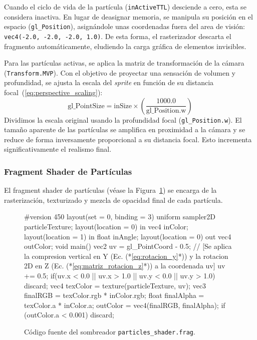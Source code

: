 Cuando el ciclo de vida de la partícula (\texttt{inActiveTTL}) desciende a cero, esta se considera inactiva. En lugar de deasignar memoria, se manipula su posición en el espacio (\texttt{gl\_Position}), asignándole unas coordenadas fuera del area de visión: \texttt{vec4(-2.0, -2.0, -2.0, 1.0)}. De esta forma, el rasterizador descarta el fragmento automáticamente, eludiendo la carga gráfica de elementos invisibles.

Para las partículas activas, se aplica la matriz de transformación de la cámara (\texttt{Transform.MVP}). Con el objetivo de proyectar una sensación de volumen y profundidad, se ajusta la escala del \textit{sprite} en función de su distancia focal~(\ref{eq:perspective_scaling}):
\begin{equation}
    \label{eq:perspective_scaling}
    \text{gl\_PointSize} = \text{inSize} \times \left( \frac{1000.0}{\text{gl\_Position.w}} \right)
\end{equation}
Dividimos la escala original usando la profundidad focal (\texttt{gl\_Position.w}). El tamaño aparente de las partículas se amplifica en proximidad a la cámara y se reduce de forma inversamente proporcional a su distancia focal. Esto incrementa significativamente el realismo final.


\subsubsection{Fragment Shader de Partículas}

El fragment shader de partículas (véase la Figura~\ref{fig:particles_shader_frag}) se encarga de la rasterización, texturizado y mezcla de opacidad final de cada partícula.

\begin{figure}[!htbp]
    \centering
\begin{carbonbox}
#version 450
layout(set = 0, binding = 3) uniform sampler2D particleTexture;
layout(location = 0) in vec4 inColor; 
layout(location = 1) in float inAngle; 
layout(location = 0) out vec4 outColor;
void main() {
    vec2 uv = gl_PointCoord - 0.5;
    // [Se aplica la compresion vertical en Y (Ec. (*\ref{eq:rotacion_y}*)) y la rotacion 2D en Z (Ec. (*\ref{eq:matriz_rotacion_z}*)) a la coordenada uv]
    uv += 0.5;
    if(uv.x < 0.0 || uv.x > 1.0 || uv.y < 0.0 || uv.y > 1.0) discard;
    vec4 texColor = texture(particleTexture, uv);
    vec3 finalRGB = texColor.rgb * inColor.rgb;
    float finalAlpha = texColor.a * inColor.a;
    outColor = vec4(finalRGB, finalAlpha);
    if (outColor.a < 0.001) discard;
}
\end{carbonbox}
    \caption{Código fuente del sombreador \texttt{particles\_shader.frag}.}
    \label{fig:particles_shader_frag}
\end{figure}

